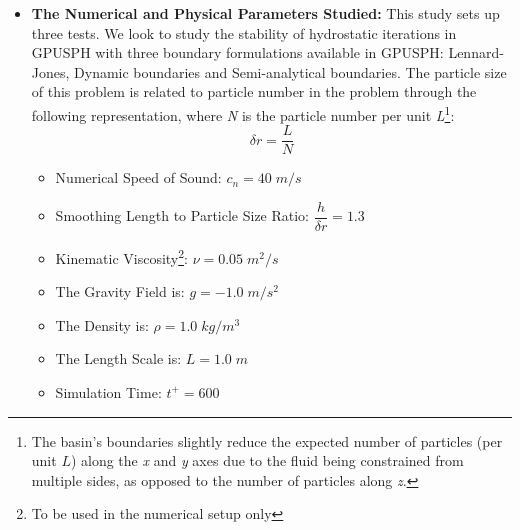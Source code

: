 \documentclass{../GPUSPHtemplate}
\begin{document}
\begin{itemize}
\item \textbf{The Numerical and Physical Parameters Studied:} This study sets up three tests.
  We look to study the stability of hydrostatic iterations in GPUSPH with three boundary formulations available in GPUSPH:
  Lennard-Jones, Dynamic boundaries and Semi-analytical boundaries.
  The particle size of this problem is related to particle number in the problem through the following representation,
  where \textit{N} is the particle number per unit
  \textit{L}\footnote{The basin's boundaries slightly reduce the expected number of particles (per unit $L$)
    along the \textit{x} and \textit{y} axes due to the fluid being constrained from multiple sides,
    as opposed to the number of particles along \textit{z}. }:
  \begin{equation}
    \delta r = \frac{L}{N} 
  \end{equation}            
  
  \begin{itemize}
  \item Numerical Speed of Sound: ${c_n} = 40 \; m/s$
  \item Smoothing Length to Particle Size Ratio: $\dfrac{h}{\delta r}=1.3$ 
  \item Kinematic Viscosity\footnote{To be used in the numerical setup only}: $\nu = 0.05 \; {m^2}/{s}$
  \item The Gravity Field is: $g = -1.0 \; {m}/{s^2}$
  \item The Density is: $\rho = 1.0 \; {kg}/{m^3} $
  \item The Length Scale is: $L = 1.0 \; m$
  \item Simulation Time: $t^+ = 600 $ 
  \end{itemize}
  
\end{itemize}



\end{document}
